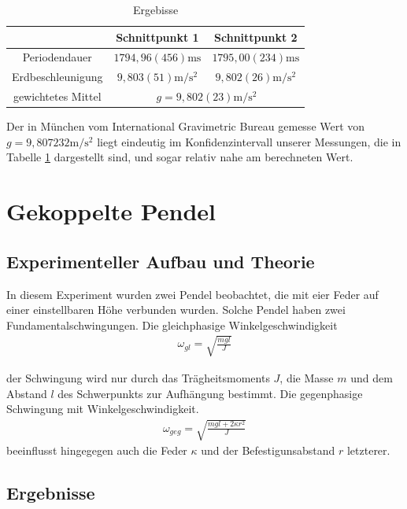 \documentclass[11pt, a4paper]{article}
\begin{document}
    \begin{table}
        \centering
        \begin{tabular}{c c c}
            & Schnittpunkt 1 & Schnittpunkt 2 \\ \hline
            Periodendauer &  $1794,96(456)\si{\milli\second} $ & $1795,00(234)\si{\milli\second} $ \\
            Erdbeschleunigung & $9,803(51)\si{\metre\per\second\squared}$ & $9,802(26)\si{\metre\per\second\squared}$ \\
            gewichtetes Mittel & \multicolumn{2}{c}{$g = 9,802(23)\si{\metre\per\square\second}$}
        \end{tabular}
        \caption{Ergebisse}
        \label{ergrev}
    \end{table}

    
    Der in München vom International Gravimetric Bureau gemesse Wert von $g = 9,807232\si{\metre\per\second\squared}$ \cite{glit} liegt
    eindeutig im Konfidenzintervall unserer Messungen, die in Tabelle \ref{ergrev} dargestellt sind, und sogar relativ nahe am berechneten Wert.


    \section{Gekoppelte Pendel}

    \subsection{Experimenteller Aufbau und Theorie}

    In diesem Experiment wurden zwei Pendel beobachtet, die mit eier Feder auf einer einstellbaren Höhe
    verbunden wurden. Solche Pendel haben zwei Fundamentalschwingungen. 
    Die gleichphasige Winkelgeschwindigkeit 
    \begin{align}
        \omega_{gl} = \sqrt{\frac{mgl}{J}}
    \end{align}
    
    der Schwingung
    wird nur durch das Trägheitsmoments $J$, die Masse $m$ und dem Abstand $l$ des Schwerpunkts zur Aufhängung bestimmt.
    Die gegenphasige Schwingung mit Winkelgeschwindigkeit. 
    \begin{align}
        \omega_{geg} = \sqrt{\frac{mgl+2\kappa r^2}{J}}
    \end{align}
    beeinflusst hingegegen auch die Feder $\kappa$ und der Befestigunsabstand $r$ letzterer.
    \subsection{Ergebnisse}
\end{document}
